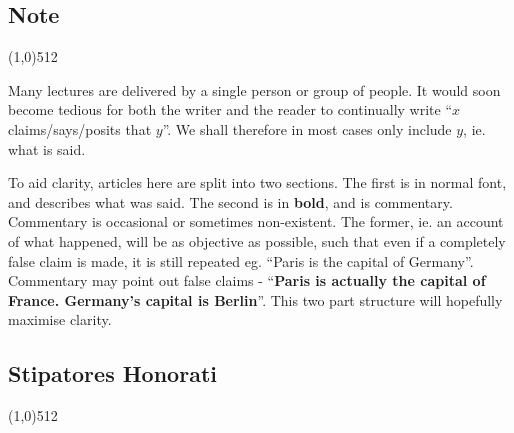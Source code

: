 \documentclass[11pt,a4paper]{report}
\let\origsection\subsection
\renewcommand{\subsection}[1]{\origsection{#1}\vspace{-0.5em}\line(1,0){512}\vspace{-1em}}
\newcounter{count}
\begin{document}
	\subsection{Note}
	\begin{multicols}{2}
		Many lectures are delivered by a single person or group of people. It would soon become tedious for both the writer and the reader to continually write ``\(x\) claims/says/posits that \(y\)''. We shall therefore in most cases only include \(y\), ie. what is said.
		
		To aid clarity, articles here are split into two sections. The first is in normal font, and describes what was said. The second is in \textbf{bold}, and is commentary. Commentary is occasional or sometimes non-existent. The former, ie. an account of what happened, will be as objective as possible, such that even if a completely false claim is made, it is still repeated eg. ``Paris is the capital of Germany''. Commentary may point out false claims - ``\textbf{Paris is actually the capital of France. Germany's capital is Berlin}''. This two part structure will hopefully maximise clarity.
		
	\end{multicols}
	
	\subsection{Stipatores Honorati}
	
\end{document}
